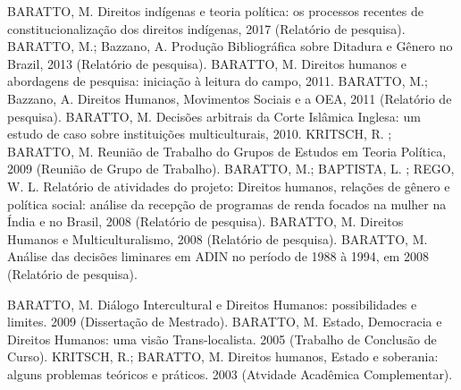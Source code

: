 
\begin{cvcitems}
  \cvcitem
    {BARATTO, M.}
    {Direitos indígenas e teoria política: os processos recentes de constitucionalização dos direitos indígenas, 2017 (Relatório de pesquisa).}
  \cvcitem
    {BARATTO, M.; Bazzano, A.}
    {Produção Bibliográfica sobre Ditadura e Gênero no Brazil, 2013 (Relatório de pesquisa).}
  \cvcitem
    {BARATTO, M.}
    {Direitos humanos e abordagens de pesquisa: iniciação à leitura do campo, 2011.}
  \cvcitem
    {BARATTO, M.; Bazzano, A.}
    {Direitos Humanos, Movimentos Sociais e a OEA, 2011 (Relatório de pesquisa).}
  \cvcitem
    {BARATTO, M.}
    {Decisões arbitrais da Corte Islâmica Inglesa: um estudo de caso sobre instituições multiculturais, 2010.}
  \cvcitem
    {KRITSCH, R. ; BARATTO, M.}
    {Reunião de Trabalho do Grupos de Estudos em Teoria Política, 2009 (Reunião de Grupo de Trabalho).}
  \cvcitem
    {BARATTO, M.; BAPTISTA, L. ; REGO, W. L.}
    {Relatório de atividades do projeto: Direitos humanos, relações de gênero e política social: análise da recepção de programas de renda focados na mulher na Índia e no Brasil, 2008 (Relatório de pesquisa).}
  \cvcitem
    {BARATTO, M.}
    {Direitos Humanos e Multiculturalismo, 2008 (Relatório de pesquisa).}
  \cvcitem
    {BARATTO, M.}
    {Análise das decisões liminares em ADIN no período de 1988 à 1994, em 2008 (Relatório de pesquisa).}
\end{cvcitems}


\begin{cvcitems}
  \cvcitem
    {BARATTO, M.}
    {Diálogo Intercultural e Direitos Humanos: possibilidades e limites. 2009 (Dissertação de Mestrado).}
  \cvcitem
    {BARATTO, M.}
    {Estado, Democracia e Direitos Humanos: uma visão Trans-localista. 2005 (Trabalho de Conclusão de Curso).}
  \cvcitem
    {KRITSCH, R.; BARATTO, M.}
    {Direitos humanos, Estado e soberania: alguns problemas teóricos e práticos. 2003
    (Atvidade Acadêmica Complementar).}
\end{cvcitems}
